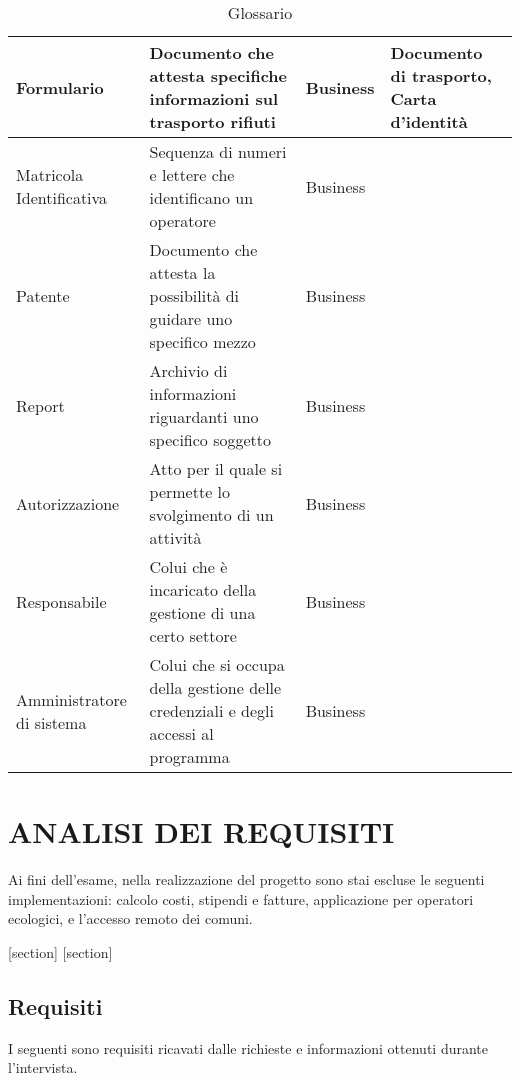 \documentclass[green, fancy, 11pt]{elegantbook}
\begin{document}
{\begin{table}[H]
\begin{tabular}{|p{}|p{8cm}|l|p{4cm}|}
		\hline
		Formulario &Documento che attesta specifiche informazioni sul trasporto rifiuti&Business &Documento di trasporto, Carta d'identità\\
		\hline
		Matricola Identificativa &Sequenza di numeri e lettere che identificano un operatore &Business&\\
		\hline
		Patente &Documento che attesta la possibilità di guidare uno specifico mezzo &Business&\\
		\hline
		Report &Archivio di informazioni riguardanti uno specifico soggetto &Business&\\
		\hline
		Autorizzazione &Atto per il quale si permette lo svolgimento di un attività &Business&\\
		\hline
		Responsabile &Colui che è incaricato della gestione di una certo settore&Business&\\
		\hline
		Amministratore di sistema &Colui che si occupa della gestione delle credenziali e degli accessi al programma &Business&\\
		\hline 
	\end{tabular}
		\caption{Glossario}
\end{table}
}
\newpage

\chapter{ANALISI DEI REQUISITI}
Ai fini dell'esame, nella realizzazione del progetto sono stai escluse le seguenti implementazioni: calcolo costi, stipendi e fatture, applicazione per operatori ecologici, e l'accesso remoto dei comuni.

[section]
[section]

\section{Requisiti}
I seguenti sono requisiti ricavati dalle richieste e informazioni ottenuti durante l'intervista.
\end{document}

